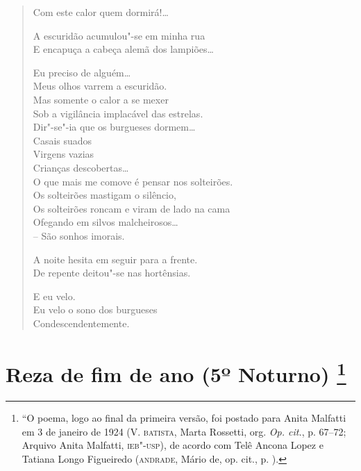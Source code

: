 \begin{verse}
Com este calor quem dormirá!\ldots{}

A escuridão acumulou"-se em minha rua\\
E encapuça a cabeça alemã dos lampiões\ldots{}

Eu preciso de alguém\ldots{}\\
Meus olhos varrem a escuridão.\\
Mas somente o calor a se mexer\\
Sob a vigilância implacável das estrelas.\\
Dir"-se"-ia que os burgueses dormem\ldots{}\\
\qquad\qquad\qquad Casais suados\\
\qquad\qquad\qquad Virgens vazias\\
\qquad\qquad\qquad Crianças descobertas\ldots{}\\
O que mais me comove é pensar nos solteirões.\\
Os solteirões mastigam o silêncio,\\
Os solteirões roncam e viram de lado na cama\\
Ofegando em silvos malcheirosos\ldots{}\\
\quad\qquad\qquad\qquad\qquad -- São sonhos imorais.

A noite hesita em seguir para a frente.\\
De repente deitou"-se nas hortênsias.

E eu velo.\\
Eu velo o sono dos burgueses\\
Condescendentemente.
\end{verse}

\chapter[Reza de fim de ano (5º Noturno)\medskip]{Reza de fim de ano (5º Noturno) \footnote{``O poema, logo ao final da
  primeira versão, foi postado para Anita Malfatti em 3 de janeiro de
  1924 (V. \textsc{batista}, Marta Rossetti, org. \emph{Op. cit.}, p. 67--72;
  Arquivo Anita Malfatti, \textsc{ieb"-usp}), de acordo com Telê Ancona Lopez e
  Tatiana Longo Figueiredo (\textsc{andrade}, Mário de, op. cit., p. ).}}

